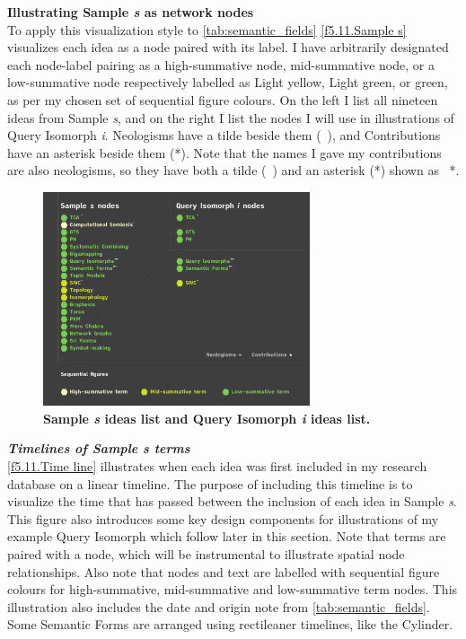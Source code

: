 \noindent \textbf{Illustrating Sample \textit{s} as network nodes}
\\

To apply this visualization style to \autoref{tab:semantic_fields} \autoref{f5.11.Sample s} visualizes each idea as a node paired with its label. I have arbitrarily designated each node-label pairing as a high-summative node, mid-summative node, or a low-summative node respectively labelled as Light yellow, Light green, or green, as per my chosen set of sequential figure colours. On the left I list all nineteen ideas from Sample \textit{s}, and on the right I list the nodes I will use in illustrations of Query Isomorph \textit{i}. Neologisms have a tilde beside them (~), and Contributions have an asterisk beside them (*). Note that the names I gave my contributions are also neologisms, so they have both a tilde (~) and an asterisk (*) shown as ~*.


\begin{figure}[h!]
    \centering
    \includegraphics[width=0.7\textwidth]{figures/5.11.Sample s.png}
    \caption[Sample \textit{s} ideas list and Query Isomorph \textit{i} ideas list]{\textbf{Sample \textit{s} ideas list and Query Isomorph \textit{i} ideas list.}}
    \label{f5.11.Sample s}
\end{figure}


\noindent \textbf{\textit{Timelines of Sample \textit{s} terms}}
\\

\autoref{f5.11.Time line} illustrates when each idea was first included in my research database on a linear timeline. The purpose of including this timeline is to visualize the time that has passed between the inclusion of each idea in Sample \textit{s}. This figure also introduces some key design components for illustrations of my example Query Isomorph which follow later in this section. Note that terms are paired with a node, which will be instrumental to illustrate spatial node relationships. Also note that nodes and text are labelled with sequential figure colours for high-summative, mid-summative and low-summative term nodes. This illustration also includes the date and origin note from \autoref{tab:semantic_fields}. Some Semantic Forms are arranged using rectileaner timelines, like the Cylinder. 

